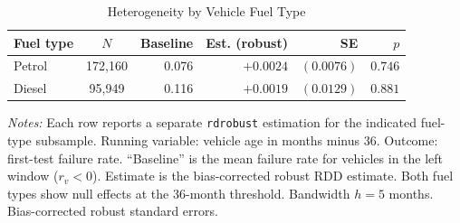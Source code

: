 \begin{table}[htbp]
\centering
\caption{Heterogeneity by Vehicle Fuel Type}\label{tab:tab:heterogeneity}
\begin{threeparttable}
\begin{tabular}{lcrrrr}
\toprule
Fuel type & $N$ & Baseline & Est. (robust) & SE & $p$ \\
\midrule
Petrol & 172,160 & 0.076 & $+0.0024$ & $(0.0076)$ & $0.746$ \\
Diesel & 95,949 & 0.116 & $+0.0019$ & $(0.0129)$ & $0.881$ \\
\bottomrule
\end{tabular}
\begin{tablenotes}
\item {\footnotesize \textit{Notes:} Each row reports a separate \texttt{rdrobust} estimation for the indicated fuel-type subsample. Running variable: vehicle age in months minus 36. Outcome: first-test failure rate. ``Baseline'' is the mean failure rate for vehicles in the left window ($r_v < 0$). Estimate is the bias-corrected robust RDD estimate. Both fuel types show null effects at the 36-month threshold. Bandwidth $h = 5$ months. Bias-corrected robust standard errors.}
\end{tablenotes}
\end{threeparttable}
\end{table}
